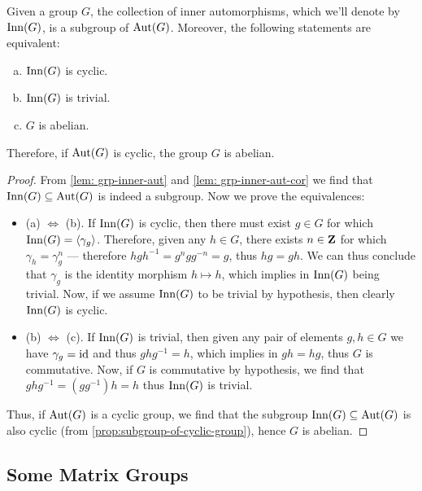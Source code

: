 \begin{lemma}
\label{lem:inner-aut-subgroup}
Given a group \(G\), the collection of inner automorphisms, which we'll denote
by \(\operatorname{Inn}(G)\), is a subgroup of \(\operatorname{Aut}(G)\). Moreover, the following statements
are equivalent:
\begin{enumerate}[(a)]\setlength\itemsep{0em}
\item \(\operatorname{Inn}(G)\) is cyclic.
\item \(\operatorname{Inn}(G)\) is trivial.
\item \(G\) is abelian.
\end{enumerate}
Therefore, if \(\operatorname{Aut}(G)\) is cyclic, the group \(G\) is abelian.
\end{lemma}

\begin{proof}
From \cref{lem: grp-inner-aut} and \cref{lem: grp-inner-aut-cor} we find that
\(\operatorname{Inn}(G) \subseteq \operatorname{Aut}(G)\) is indeed a subgroup. Now we prove the
equivalences:
\begin{itemize}\setlength\itemsep{0em}
\item (a) \(\Leftrightarrow\) (b). If \(\operatorname{Inn}(G)\) is cyclic, then there must
exist \(g \in G\) for which \(\operatorname{Inn}(G) = \langle \gamma_g \rangle\). Therefore,
given any \(h \in G\), there exists \(n \in \mathbf{Z}\) for which \(\gamma_h =
\gamma_g^n\) --- therefore \(h g h^{-1} = g^n g g^{-n} = g\), thus \(h g = g
h\). We can thus conclude that \(\gamma_g\) is the identity morphism \(h \mapsto
h\), which implies in \(\operatorname{Inn}(G)\) being trivial. Now, if we assume \(\operatorname{Inn}(G)\)
to be trivial by hypothesis, then clearly \(\operatorname{Inn}(G)\) is cyclic.

\item (b) \(\Leftrightarrow\) (c). If \(\operatorname{Inn}(G)\) is trivial, then given any
pair of elements \(g, h \in G\) we have \(\gamma_g = \operatorname{id}\) and thus \(g h g^{-1}
= h\), which implies in \(g h = h g\), thus \(G\) is commutative. Now, if \(G\)
is commutative by hypothesis, we find that \(g h g^{-1} = (g g^{-1}) h = h\)
thus \(\operatorname{Inn}(G)\) is trivial.
\end{itemize}
Thus, if \(\operatorname{Aut}(G)\) is a cyclic group, we find that the subgroup \(\operatorname{Inn}(G)
\subseteq \operatorname{Aut}(G)\) is also cyclic (from \cref{prop:subgroup-of-cyclic-group}),
hence \(G\) is abelian.
\end{proof}

\subsection{Some Matrix Groups}

